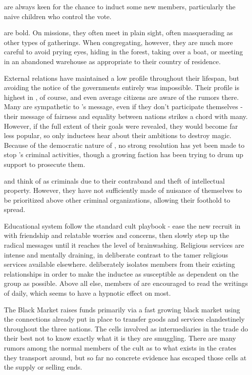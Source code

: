 \documentclass[blue]{GL2020}
\begin{document}
\pCult are always keen for the chance to induct some new members, particularly the naive children who control the vote.

\pCult are bold. On missions, they often meet in plain sight, often masquerading as other types of gatherings. When congregating, however, they are much more careful to avoid prying eyes, hiding in the forest, taking over a boat, or meeting in an abandoned warehouse as appropriate to their country of residence.

External relations
\pCult have maintained a low profile throughout their lifespan, but avoiding the notice of the governments entirely was impossible. Their profile is highest in \pViking, of course, and even average citizens are aware of the rumors there. Many \pViking{\people} are sympathetic to \cCult's message, even if they don’t participate themselves - their message of fairness and equality between nations strikes a chord with many. However, if the full extent of their goals were revealed, they would become far less popular, so only inductees hear about their ambitions to destroy magic. Because of the democratic nature of \pViking, no strong resolution has yet been made to stop \Cult's criminal activities, though a growing faction has been trying to drum up support to prosecute them.

\pTech and \pFarm think of \pCult as criminals due to their contraband and theft of intellectual property. However, they have not sufficiently made of nuisance of themselves to be prioritized above other criminal organizations, allowing their foothold to spread.

Educational system
\pCult follow the standard cult playbook - ease the new recruit in with friendship and relatable worries and concerns, then slowly step up the radical messages until it reaches the level of brainwashing. Religious services are intense and mentally draining, in deliberate contrast to the tamer religious services available elsewhere. \pCult deliberately isolates members from their existing relationships in order to make the inductee as susceptible as dependent on the group as possible. Above all else, members of \pCult are encouraged to read the writings of \cCultLeader daily, which seems to have a hypnotic effect on most.

The Black Market
\pCult raises funds primarily via a fast growing black market using the connections already put in place to transfer goods and services clandestinely throughout the three nations. The cells involved as intermediaries in the trade do their best not to know exactly what it is they are smuggling. There are many rumors among the normal members of the cult as to what exists in the crates they transport around, but so far no concrete evidence has escaped those cells at the supply or selling ends.
\end{document}
